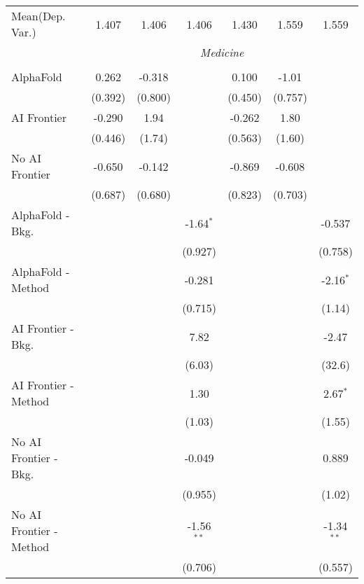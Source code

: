\begin{tabular}{lcccccc}
Mean(Dep. Var.) & 1.407 & 1.406 & 1.406 & 1.430 & 1.559 & 1.559 \\
 & \multicolumn{6}{c}{\textit{Medicine}} \\ \\
   AlphaFold               & 0.262   & -0.318  &              & 0.100   & -1.01   &   \\   
                           & (0.392) & (0.800) &              & (0.450) & (0.757) &   \\   
   AI Frontier             & -0.290  & 1.94    &              & -0.262  & 1.80    &   \\   
                           & (0.446) & (1.74)  &              & (0.563) & (1.60)  &   \\   
   No AI Frontier          & -0.650  & -0.142  &              & -0.869  & -0.608  &   \\   
                           & (0.687) & (0.680) &              & (0.823) & (0.703) &   \\   
   AlphaFold - Bkg.        &         &         & -1.64$^{*}$  &         &         & -0.537\\   
                           &         &         & (0.927)      &         &         & (0.758)\\   
   AlphaFold - Method      &         &         & -0.281       &         &         & -2.16$^{*}$\\   
                           &         &         & (0.715)      &         &         & (1.14)\\   
   AI Frontier - Bkg.      &         &         & 7.82         &         &         & -2.47\\   
                           &         &         & (6.03)       &         &         & (32.6)\\   
   AI Frontier - Method    &         &         & 1.30         &         &         & 2.67$^{*}$\\   
                           &         &         & (1.03)       &         &         & (1.55)\\   
   No AI Frontier - Bkg.   &         &         & -0.049       &         &         & 0.889\\   
                           &         &         & (0.955)      &         &         & (1.02)\\   
   No AI Frontier - Method &         &         & -1.56$^{**}$ &         &         & -1.34$^{**}$\\   
                           &         &         & (0.706)      &         &         & (0.557)\\   

\end{tabular}
